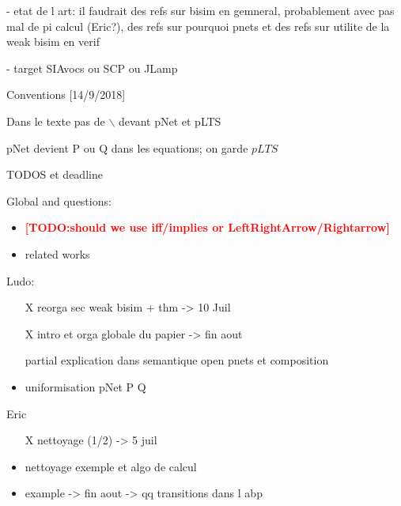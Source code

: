 \documentclass{lncs/llncs}
\newcommand{\TODO}[1]{\textcolor{red}{\textbf{[TODO:#1]}}}
\begin{document}
- etat de l art: il faudrait des refs sur bisim en gemneral, probablement avec pas mal de pi calcul (Eric?), des refs sur pourquoi pnets et des refs sur utilite de la weak bisim en verif



- target SIAvocs ou SCP ou JLamp

Conventions
[14/9/2018] 

Dans le texte pas de $\backslash$ devant pNet et pLTS

pNet devient P ou Q dans les equations; on garde $pLTS$

\medskip

TODOS et deadline


Global and questions:
\begin{itemize}
\item \TODO{should we use iff/implies or LeftRightArrow/Rightarrow}
\item related works
\end{itemize}
Ludo:
\begin{itemize}
\item[X] reorga sec weak bisim + thm -> 10 Juil
\item[X]  intro et orga globale du papier -> fin aout
\item[partial] explication dans semantique open pnets et composition
\item uniformisation pNet P Q
\end{itemize}

\medskip

Eric
\begin{itemize}
\item[X] nettoyage (1/2) -> 5 juil
\item nettoyage exemple et algo de calcul
\item example -> fin aout -> qq transitions dans l abp
\end{itemize}
\end{document}
